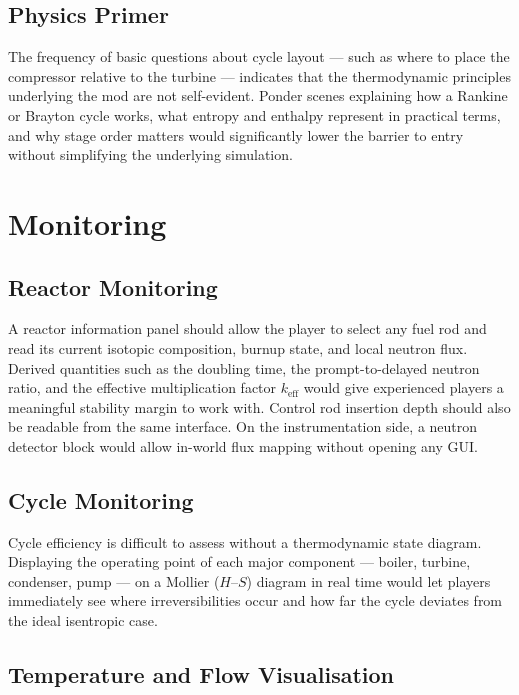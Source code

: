 \documentclass{report}
\begin{document}
\subsection{Physics Primer}

The frequency of basic questions about cycle layout — such as where to place the
compressor relative to the turbine — indicates that the thermodynamic principles
underlying the mod are not self-evident. Ponder scenes explaining how a Rankine or
Brayton cycle works, what entropy and enthalpy represent in practical terms, and why
stage order matters would significantly lower the barrier to entry without simplifying
the underlying simulation.

\section{Monitoring}

\subsection{Reactor Monitoring}

A reactor information panel should allow the player to select any fuel rod and read its
current isotopic composition, burnup state, and local neutron flux. Derived quantities
such as the doubling time, the prompt-to-delayed neutron ratio, and the effective
multiplication factor $k_{\text{eff}}$ would give experienced players a meaningful
stability margin to work with. Control rod insertion depth should also be readable from
the same interface. On the instrumentation side, a neutron detector block would allow
in-world flux mapping without opening any GUI.

\subsection{Cycle Monitoring}

Cycle efficiency is difficult to assess without a thermodynamic state diagram.
Displaying the operating point of each major component — boiler, turbine, condenser,
pump — on a Mollier ($H$--$S$) diagram in real time would let players immediately see
where irreversibilities occur and how far the cycle deviates from the ideal isentropic
case.

\subsection{Temperature and Flow Visualisation}
\end{document}

